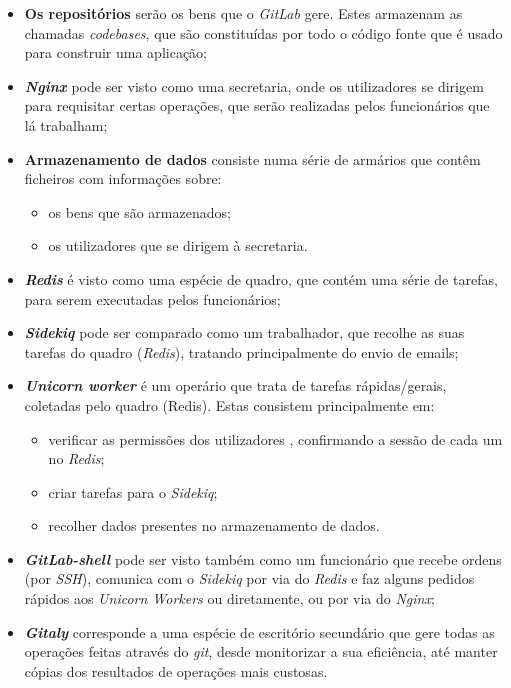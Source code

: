 \documentclass[12pt,a4paper]{article}
\begin{document}
\begin{itemize}
    \item \textbf{Os repositórios} serão os bens que o \emph{GitLab} gere. Estes armazenam as chamadas \textit{codebases}, que são constituídas por todo o código fonte que é usado para construir uma aplicação;
    \item \textbf{\emph{Nginx}} pode ser visto como uma secretaria, onde os utilizadores se dirigem para requisitar certas operações, que serão realizadas pelos funcionários que lá trabalham;
    \item \textbf{Armazenamento de dados} consiste numa série de armários que contêm ficheiros com informações sobre:
    \begin{itemize}
        \item os bens que são armazenados;
        \item os utilizadores que se dirigem à secretaria.
    \end{itemize}
    \item \textbf{\emph{Redis}} é visto como uma espécie de quadro, que contém uma série de tarefas, para serem executadas pelos funcionários;
    \item \textbf{\emph{Sidekiq}} pode ser comparado como um trabalhador, que recolhe as suas tarefas do quadro (\emph{Redis}), tratando principalmente do envio de emails;
    \item \textbf{\emph{Unicorn worker}} é um operário que trata de tarefas rápidas/gerais, coletadas pelo quadro (Redis). Estas consistem principalmente em:
    \begin{itemize}
        \item verificar as permissões dos utilizadores , confirmando a sessão de cada um no \emph{Redis};
        \item criar tarefas para o \emph{Sidekiq};
        \item recolher dados presentes no armazenamento de dados.
    \end{itemize}
    \item \textbf{\emph{GitLab-shell}} pode ser visto também como um funcionário que recebe ordens (por \emph{SSH}), comunica com o \emph{Sidekiq} por via do \emph{Redis} e faz alguns pedidos rápidos aos \emph{Unicorn Workers} ou diretamente, ou por via do \emph{Nginx};
    \item \textbf{\emph{Gitaly}} corresponde a uma espécie de escritório secundário que gere todas as operações feitas através do \emph{git}, desde monitorizar a sua eficiência, até manter cópias dos resultados de operações mais custosas.
\end{itemize}
\end{document}
